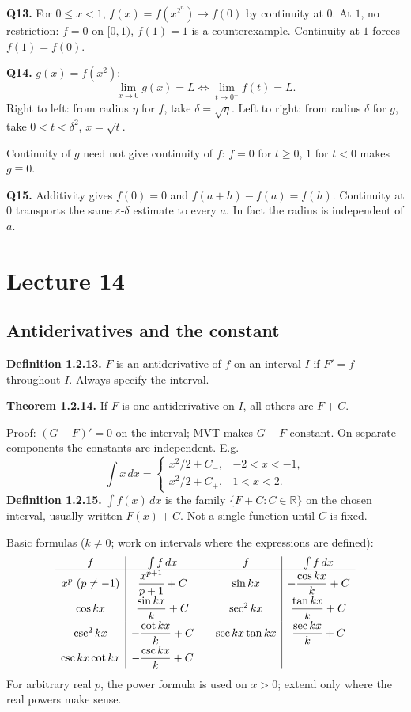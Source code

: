 \documentclass[11pt,letterpaper]{article}
\begin{document}
\textbf{Q13.} For \(0\le x<1\), \(f(x)=f(x^{2^n})\to f(0)\) by
continuity at \(0\). At \(1\), no restriction: \(f=0\) on \([0,1)\),
\(f(1)=1\) is a counterexample. Continuity at \(1\) forces
\(f(1)=f(0)\).

\textbf{Q14.} \(g(x)=f(x^2)\): \[
\lim_{x\to0}g(x)=L\iff\lim_{t\to0^+}f(t)=L.
\] Right to left: from radius \(\eta\) for \(f\), take
\(\delta=\sqrt\eta\). Left to right: from radius \(\delta\) for \(g\),
take \(0<t<\delta^2\), \(x=\sqrt t\).

Continuity of \(g\) need not give continuity of \(f\): \(f=0\) for
\(t\ge0\), \(1\) for \(t<0\) makes \(g\equiv0\).

\textbf{Q15.} Additivity gives \(f(0)=0\) and \(f(a+h)-f(a)=f(h)\).
Continuity at \(0\) transports the same \(\varepsilon\)-\(\delta\)
estimate to every \(a\). In fact the radius is independent of \(a\).

\newpage

\section{Lecture 14}\label{lecture-14}

\subsection{Antiderivatives and the
constant}\label{antiderivatives-and-the-constant}

\textbf{Definition 1.2.13.} \(F\) is an antiderivative of \(f\) on an
interval \(I\) if \(F'=f\) throughout \(I\). Always specify the
interval.

\textbf{Theorem 1.2.14.} If \(F\) is one antiderivative on \(I\), all
others are \(F+C\).

Proof: \((G-F)'=0\) on the interval; MVT makes \(G-F\) constant. On
separate components the constants are independent. E.g. \[
\int x\,dx=\begin{cases}x^2/2+C_-,&-2<x<-1,\\x^2/2+C_+,&1<x<2.\end{cases}
\] \textbf{Definition 1.2.15.} \(\int f(x)\,dx\) is the family
\(\{F+C:C\in\mathbb R\}\) on the chosen interval, usually written
\(F(x)+C\). Not a single function until \(C\) is fixed.

Basic formulas (\(k\ne0\); work on intervals where the expressions are
defined): \[
\begin{array}{c|c@{\qquad}c|c}
f&\int f\,dx&f&\int f\,dx\\\hline
x^p\ (p\ne-1)&\dfrac{x^{p+1}}{p+1}+C&\sin kx&-\dfrac{\cos kx}{k}+C\\[5pt]
\cos kx&\dfrac{\sin kx}{k}+C&\sec^2kx&\dfrac{\tan kx}{k}+C\\[5pt]
\csc^2kx&-\dfrac{\cot kx}{k}+C&\sec kx\tan kx&\dfrac{\sec kx}{k}+C\\[5pt]
\csc kx\cot kx&-\dfrac{\csc kx}{k}+C&&
\end{array}
\] For arbitrary real \(p\), the power formula is used on \(x>0\);
extend only where the real powers make sense.
\end{document}
